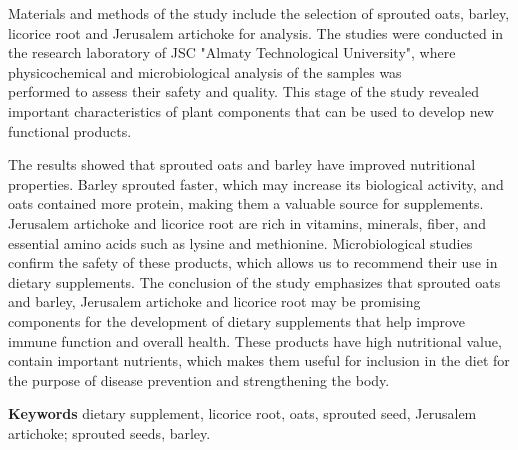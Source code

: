 Materials and methods of the study include the selection of sprouted
oats, barley, licorice root and Jerusalem artichoke for analysis. The
studies were conducted in the research laboratory of JSC "Almaty
Technological University", where physicochemical and microbiological
analysis of the samples was \\performed to assess their safety and
quality. This stage of the study revealed important characteristics of
plant components that can be used to develop new functional products.

The results showed that sprouted oats and barley have improved
nutritional properties. Barley sprouted faster, which may increase its
biological activity, and oats contained more protein, making them a
valuable source for supplements. Jerusalem artichoke and licorice root
are rich in vitamins, minerals, fiber, and essential amino acids such as
lysine and methionine. Microbiological studies confirm the safety of
these products, which allows us to recommend their use in dietary
supplements. The conclusion of the study emphasizes that sprouted oats
and barley, Jerusalem artichoke and licorice root may be promising\\
components for the development of dietary supplements that help improve
immune function and overall health. These products have high nutritional
value, contain important nutrients, which makes them useful for
inclusion in the diet for the purpose of disease prevention and
strengthening the body.

{\bfseries Keywords} dietary supplement, licorice root, oats, sprouted
seed, Jerusalem artichoke; sprouted seeds, barley.

